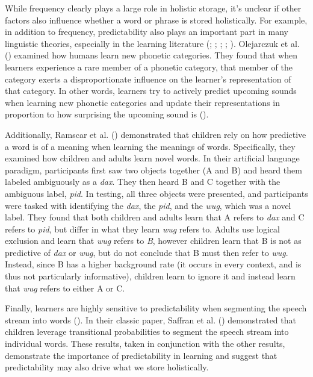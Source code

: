 \documentclass[
  12pt,
  letterpaper,
]{scrreport}
\begin{document}
While frequency clearly plays a large role in holistic storage, it's
unclear if other factors also influence whether a word or phrase is
stored holistically. For example, in addition to frequency,
predictability also plays an important part in many linguistic theories,
especially in the learning literature
(;
;
; ; ). Olejarczuk et al.
()
examined how humans learn new phonetic categories. They found that when
learners experience a rare member of a phonetic category, that member of
the category exerts a disproportionate influence on the learner's
representation of that category. In other words, learners try to
actively predict upcoming sounds when learning new phonetic categories
and update their representations in proportion to how surprising the
upcoming sound is
().

Additionally, Ramscar et al.
()
demonstrated that children rely on how predictive a word is of a meaning
when learning the meanings of words. Specifically, they examined how
children and adults learn novel words. In their artificial language
paradigm, participants first saw two objects together (A and B) and
heard them labeled ambiguously as a \emph{dax}. They then heard B and C
together with the ambiguous label, \emph{pid}. In testing, all three
objects were presented, and participants were tasked with identifying
the \emph{dax}, the \emph{pid}, and the \emph{wug}, which was a novel
label. They found that both children and adults learn that A refers to
\emph{dax} and C refers to \emph{pid}, but differ in what they learn
\emph{wug} refers to. Adults use logical exclusion and learn that
\emph{wug} refers to \emph{B}, however children learn that B is not as
predictive of \emph{dax} or \emph{wug}, but do not conclude that B must
then refer to \emph{wug}. Instead, since B has a higher background rate
(it occurs in every context, and is thus not particularly informative),
children learn to ignore it and instead learn that \emph{wug} refers to
either A or C.

Finally, learners are highly sensitive to predictability when segmenting
the speech stream into words
(). In their classic paper, Saffran et al.
()
demonstrated that children leverage transitional probabilities to
segment the speech stream into individual words. These results, taken in
conjunction with the other results, demonstrate the importance of
predictability in learning and suggest that predictability may also
drive what we store holistically.
\end{document}
